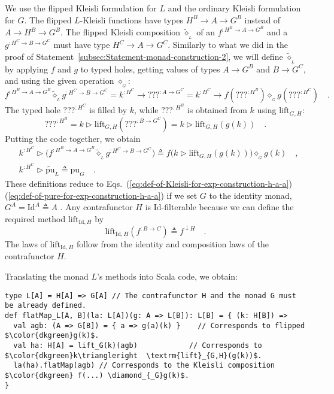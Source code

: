 We use the flipped Kleisli formulation for $L$ and the ordinary Kleisli
formulation for $G$. The flipped $L$-Kleisli functions have types
$H^{B}\rightarrow A\rightarrow G^{B}$ instead of $A\rightarrow H^{B}\rightarrow G^{B}$.
The flipped Kleisli composition $\tilde{\diamond}_{_{L}}$ of an $f^{:H^{B}\rightarrow A\rightarrow G^{B}}$
and a $g^{:H^{C}\rightarrow B\rightarrow G^{C}}$ must have type $H^{C}\rightarrow A\rightarrow G^{C}$.
Similarly to what we did in the proof of Statement~\ref{subsec:Statement-monad-construction-2},
we will define $\tilde{\diamond}_{_{L}}$ by applying $f$ and $g$
to typed holes, getting values of types $A\rightarrow G^{B}$ and
$B\rightarrow G^{C}$, and using the given operation $\diamond_{_{G}}$:
\[
f^{:H^{B}\rightarrow A\rightarrow G^{B}}\tilde{\diamond}_{_{L}}g^{:H^{C}\rightarrow B\rightarrow G^{C}}=k^{:H^{C}}\rightarrow\text{???}^{:A\rightarrow G^{C}}=k^{:H^{C}}\rightarrow f(\text{???}^{:H^{B}})\diamond_{_{G}}g(\text{???}^{:H^{C}})\quad.
\]
The typed hole $\text{???}^{:H^{C}}$ is filled by $k$, while $\text{???}^{:H^{B}}$
is obtained from $k$ using $\text{lift}_{G,H}$:
\[
\text{???}^{:H^{B}}=k\triangleright\text{lift}_{G,H}(\text{???}^{:B\rightarrow G^{C}})=k\triangleright\text{lift}_{G,H}(g(k))\quad.
\]
Putting the code together, we obtain
\begin{align*}
 & k^{:H^{C}}\triangleright\big(f^{:H^{B}\rightarrow A\rightarrow G^{B}}\tilde{\diamond}_{_{L}}g^{:H^{C}\rightarrow B\rightarrow G^{C}}\big)\triangleq f\big(k\triangleright\text{lift}_{G,H}(g(k))\big)\diamond_{_{G}}g(k)\quad,\\
 & k^{:H^{C}}\triangleright\tilde{\text{pu}}_{L}\triangleq\text{pu}_{G}\quad.
\end{align*}
These definitions reduce to Eqs.~(\ref{eq:def-of-Kleisli-for-exp-construction-h-a-a})\textendash (\ref{eq:def-of-pure-for-exp-construction-h-a-a})
if we set $G$ to the identity monad, $G^{A}=\text{Id}^{A}\triangleq A$
. Any contrafunctor $H$ is $\text{Id}$-filterable because we can
define the required method $\text{lift}_{\text{Id},H}$ by
\[
\text{lift}_{\text{Id},H}(f^{:B\rightarrow C})\triangleq f^{\downarrow H}\quad.
\]
The laws of $\text{lift}_{\text{Id},H}$ follow from the identity
and composition laws of the contrafunctor $H$.

Translating the monad $L$\textsf{'}s methods into Scala code, we obtain:
\begin{lstlisting}[mathescape=true]
type L[A] = H[A] => G[A] // The contrafunctor H and the monad G must be already defined.
def flatMap_L[A, B](la: L[A])(g: A => L[B]): L[B] = { (k: H[B]) =>
  val agb: (A => G[B]) = { a => g(a)(k) }    // Corresponds to flipped $\color{dkgreen}g(k)$.
  val ha: H[A] = lift_G(k)(agb)            // Corresponds to $\color{dkgreen}k\triangleright  \textrm{lift}_{G,H}(g(k))$.
  la(ha).flatMap(agb) // Corresponds to the Kleisli composition $\color{dkgreen} f(...) \diamond_{_G}g(k)$.
}
\end{lstlisting}

